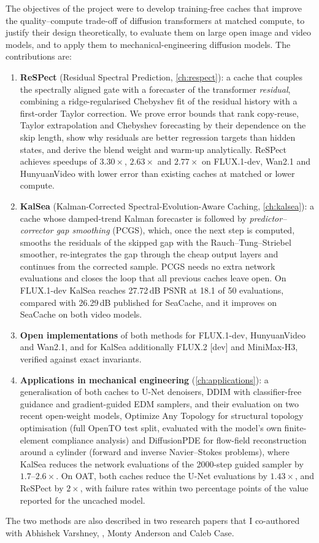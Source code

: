 The objectives of the project were to develop training-free caches that improve the quality--compute trade-off of diffusion transformers at matched compute, to justify their design theoretically, to evaluate them on large open image and video models, and to apply them to mechanical-engineering diffusion models. The contributions are:
\begin{enumerate}
  \item \textbf{ReSPect} (Residual Spectral Prediction, \cref{ch:respect}): a cache that couples the spectrally aligned gate with a forecaster of the transformer \emph{residual}, combining a ridge-regularised Chebyshev fit of the residual history with a first-order Taylor correction. We prove error bounds that rank copy-reuse, Taylor extrapolation and Chebyshev forecasting by their dependence on the skip length, show why residuals are better regression targets than hidden states, and derive the blend weight and warm-up analytically. ReSPect achieves speedups of $3.30\times$, $2.63\times$ and $2.77\times$ on FLUX.1-dev, Wan2.1 and HunyuanVideo with lower error than existing caches at matched or lower compute.
  \item \textbf{KalSea} (Kalman-Corrected Spectral-Evolution-Aware Caching, \cref{ch:kalsea}): a cache whose damped-trend Kalman forecaster is followed by \emph{predictor--corrector gap smoothing} (PCGS), which, once the next step is computed, smooths the residuals of the skipped gap with the Rauch--Tung--Striebel smoother, re-integrates the gap through the cheap output layers and continues from the corrected sample. PCGS needs no extra network evaluations and closes the loop that all previous caches leave open. On FLUX.1-dev KalSea reaches 27.72\,dB PSNR at 18.1 of 50 evaluations, compared with 26.29\,dB published for SeaCache, and it improves on SeaCache on both video models.
  \item \textbf{Open implementations} of both methods for FLUX.1-dev, HunyuanVideo and Wan2.1, and for KalSea additionally FLUX.2 [dev] and MiniMax-H3, verified against exact invariants.
  \item \textbf{Applications in mechanical engineering} (\cref{ch:applications}): a generalisation of both caches to U-Net denoisers, DDIM with classifier-free guidance and gradient-guided EDM samplers, and their evaluation on two recent open-weight models, Optimize Any Topology for structural topology optimisation (full OpenTO test split, evaluated with the model's own finite-element compliance analysis) and DiffusionPDE for flow-field reconstruction around a cylinder (forward and inverse Navier--Stokes problems), where KalSea reduces the network evaluations of the 2000-step guided sampler by $1.7$--$2.6\times$. On OAT, both caches reduce the U-Net evaluations by $1.43\times$, and ReSPect by $2\times$, with failure rates within two percentage points of the value reported for the uncached model.
\end{enumerate}
The two methods are also described in two research papers that I co-authored with Abhishek Varshney, \guidename, Monty Anderson and Caleb Case.

